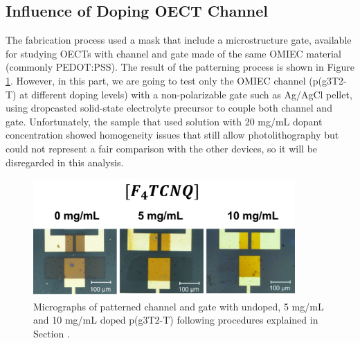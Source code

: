 
\subsection{Influence of Doping OECT Channel}
The fabrication process used a mask that include a microstructure gate, available for studying OECTs with channel and gate made of the same OMIEC material (commonly PEDOT:PSS). The result of the patterning process is shown in Figure \ref{fig:channel}. However, in this part, we are going to test only the OMIEC channel (p(g3T2-T) at different doping levels) with a non-polarizable gate such as Ag/AgCl pellet, using dropcasted solid-state electrolyte precursor to couple both channel and gate. Unfortunately, the sample that used solution with 20 mg/mL dopant concentration showed homogeneity issues that still allow photolithography but could not represent a fair comparison with the other devices, so it will be disregarded in this analysis.

\begin{figure}[ht]
  \centering
  \includegraphics[width=10cm]{Images/pdf/BigGateDevices.pdf}
  \caption[Micrographs of a patterned channel and gate p(g3T2-T) at different doping levels]{Micrographs of patterned channel and gate with undoped, 5 mg/mL and 10 mg/mL doped p(g3T2-T) following procedures explained in Section \label{subsec:photo}.}
  \label{fig:channel}
\end{figure}


